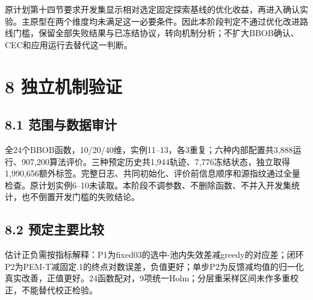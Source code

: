 \documentclass[11pt,a4paper]{article}
\begin{document}
原计划第十四节要求开发集显示相对选定固定探索基线的优化收益，再进入确认实验。主原型在两个维度均未满足这一必要条件。因此本阶段判定不通过优化改进路线门槛，保留全部失败结果与已冻结协议，转向机制分析；不扩大BBOB确认、CEC和应用运行去替代这一判断。

\hypertarget{ux72ecux7acbux673aux5236ux9a8cux8bc1}{%
\section{8 独立机制验证}\label{ux72ecux7acbux673aux5236ux9a8cux8bc1}}

\hypertarget{ux8303ux56f4ux4e0eux6570ux636eux5ba1ux8ba1}{%
\subsection{8.1
范围与数据审计}\label{ux8303ux56f4ux4e0eux6570ux636eux5ba1ux8ba1}}

全24个BBOB函数，10/20/40维，实例11--13，各3重复；六种内部配置共3,888运行、907,200算法评价。三种预定历史共1,944轨迹、7,776冻结状态，独立取得1,990,656额外标签。完整日志、共同初始化、评价前信息顺序和源指纹通过全量检查。原计划实例6--10未读取。本阶段不调参数、不删除函数、不并入开发集统计，也不倒置开发门槛的失败结论。

\hypertarget{ux9884ux5b9aux4e3bux8981ux6bd4ux8f83}{%
\subsection{8.2
预定主要比较}\label{ux9884ux5b9aux4e3bux8981ux6bd4ux8f83}}

估计正负需按指标解释：P1为fixed03的选中-池内失效差减greedy的对应差；闭环P2为PEM-T减固定.1的终点对数误差，负值更好；单步P2为反馈减均值的归一化真实改善，正值更好。24函数配对，9项统一Holm；分层重采样区间未作多重校正，不能替代校正检验。
\end{document}
